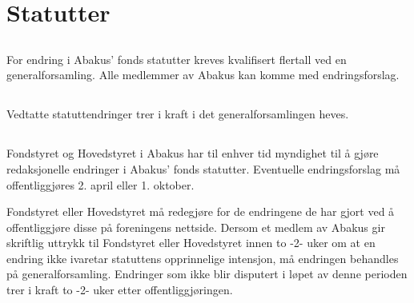 \section{Statutter}

\subsection{}
For endring i Abakus’ fonds statutter kreves kvalifisert flertall ved en
generalforsamling. Alle medlemmer av Abakus kan komme med endringsforslag.

\subsection{}
Vedtatte statuttendringer trer i kraft i det generalforsamlingen heves.

\subsection{}
Fondstyret og Hovedstyret i Abakus har til enhver tid myndighet til å gjøre redaksjonelle endringer i Abakus' fonds statutter. Eventuelle endringsforslag må offentliggjøres 2. april eller 1. oktober.

Fondstyret eller Hovedstyret må redegjøre for de endringene de har gjort ved å offentliggjøre disse på foreningens nettside. Dersom et medlem av Abakus gir skriftlig uttrykk til Fondstyret eller Hovedstyret innen to -2- uker om at en endring ikke ivaretar statuttens opprinnelige intensjon, må endringen behandles på generalforsamling. Endringer som ikke blir disputert i løpet av denne perioden trer i kraft to -2- uker etter offentliggjøringen.
